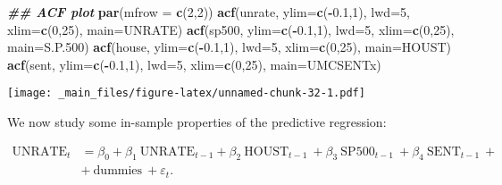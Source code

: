\documentclass[
]{book}
\newenvironment{Shaded}{\begin{snugshade}}{\end{snugshade}}
\newcommand{\AttributeTok}[1]{\textcolor[rgb]{0.13,0.29,0.53}{#1}}
\newcommand{\DecValTok}[1]{\textcolor[rgb]{0.00,0.00,0.81}{#1}}
\newcommand{\DocumentationTok}[1]{\textcolor[rgb]{0.56,0.35,0.01}{\textbf{\textit{#1}}}}
\newcommand{\FloatTok}[1]{\textcolor[rgb]{0.00,0.00,0.81}{#1}}
\newcommand{\FunctionTok}[1]{\textcolor[rgb]{0.13,0.29,0.53}{\textbf{#1}}}
\newcommand{\NormalTok}[1]{#1}
\newcommand{\SpecialCharTok}[1]{\textcolor[rgb]{0.81,0.36,0.00}{\textbf{#1}}}
\newcommand{\StringTok}[1]{\textcolor[rgb]{0.31,0.60,0.02}{#1}}
\begin{document}
\begin{Shaded}
\begin{Highlighting}[]
\DocumentationTok{\#\# ACF plot}
\FunctionTok{par}\NormalTok{(}\AttributeTok{mfrow =} \FunctionTok{c}\NormalTok{(}\DecValTok{2}\NormalTok{,}\DecValTok{2}\NormalTok{))}
\FunctionTok{acf}\NormalTok{(unrate, }\AttributeTok{ylim=}\FunctionTok{c}\NormalTok{(}\SpecialCharTok{{-}}\FloatTok{0.1}\NormalTok{,}\DecValTok{1}\NormalTok{), }\AttributeTok{lwd=}\DecValTok{5}\NormalTok{, }\AttributeTok{xlim=}\FunctionTok{c}\NormalTok{(}\DecValTok{0}\NormalTok{,}\DecValTok{25}\NormalTok{), }\AttributeTok{main=}\StringTok{\textquotesingle{}UNRATE\textquotesingle{}}\NormalTok{)}
\FunctionTok{acf}\NormalTok{(sp500,  }\AttributeTok{ylim=}\FunctionTok{c}\NormalTok{(}\SpecialCharTok{{-}}\FloatTok{0.1}\NormalTok{,}\DecValTok{1}\NormalTok{), }\AttributeTok{lwd=}\DecValTok{5}\NormalTok{, }\AttributeTok{xlim=}\FunctionTok{c}\NormalTok{(}\DecValTok{0}\NormalTok{,}\DecValTok{25}\NormalTok{), }\AttributeTok{main=}\StringTok{\textquotesingle{}S.P.500\textquotesingle{}}\NormalTok{)}
\FunctionTok{acf}\NormalTok{(house,  }\AttributeTok{ylim=}\FunctionTok{c}\NormalTok{(}\SpecialCharTok{{-}}\FloatTok{0.1}\NormalTok{,}\DecValTok{1}\NormalTok{), }\AttributeTok{lwd=}\DecValTok{5}\NormalTok{, }\AttributeTok{xlim=}\FunctionTok{c}\NormalTok{(}\DecValTok{0}\NormalTok{,}\DecValTok{25}\NormalTok{), }\AttributeTok{main=}\StringTok{\textquotesingle{}HOUST\textquotesingle{}}\NormalTok{)}
\FunctionTok{acf}\NormalTok{(sent,   }\AttributeTok{ylim=}\FunctionTok{c}\NormalTok{(}\SpecialCharTok{{-}}\FloatTok{0.1}\NormalTok{,}\DecValTok{1}\NormalTok{), }\AttributeTok{lwd=}\DecValTok{5}\NormalTok{, }\AttributeTok{xlim=}\FunctionTok{c}\NormalTok{(}\DecValTok{0}\NormalTok{,}\DecValTok{25}\NormalTok{), }\AttributeTok{main=}\StringTok{\textquotesingle{}UMCSENTx\textquotesingle{}}\NormalTok{)}
\end{Highlighting}
\end{Shaded}

\texttt{[image: \_main\_files/figure-latex/unnamed-chunk-32-1.pdf]}

We now study some in-sample properties of the predictive regression:

\[
\begin{aligned}
\text{UNRATE}_t &= \beta_0 + \beta_1 \ \text{UNRATE}_{t-1} + \beta_2 \ \text{HOUST}_{t-1} \ + \beta_3 \ \text{SP500}_{t-1} \ + \beta_4 \ \text{SENT}_{t-1} \ +\\
 &+ \ \text{dummies} \ + \varepsilon_t.
\end{aligned}
\]
\end{document}
